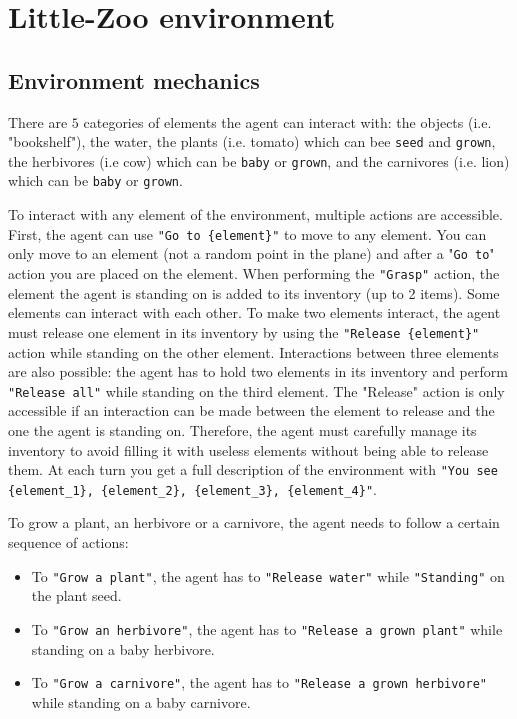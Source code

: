 \newpage
\section{Little-Zoo environment}\label{app:environment}

\subsection{Environment mechanics}
\label{app:environment_mechanics}

There are $5$ categories of elements the agent can interact with: the objects (i.e. "bookshelf"), the water, the plants (i.e. tomato) which can bee \texttt{seed} and \texttt{grown}, the herbivores (i.e cow) which can be \texttt{baby} or \texttt{grown}, and the carnivores (i.e. lion) which can be \texttt{baby} or \texttt{grown}. 

To interact with any element of the environment, multiple actions are accessible. First, the agent can use \texttt{"Go to \{element\}"} to move to any element. You can only move to an element (not a random point in the plane) and after a "\texttt{Go to}" action you are placed on the element. When performing the \texttt{"Grasp"} action, the element the agent is standing on is added to its inventory (up to 2 items). Some elements can interact with each other. To make two elements interact, the agent must release one element in its inventory by using the \texttt{"Release \{element\}"} action while standing on the other element. Interactions between three elements are also possible: the agent has to hold two elements in its inventory and perform \texttt{"Release all"} while standing on the third element. The "Release" action is only accessible if an interaction can be made between the element to release and the one the agent is standing on. Therefore, the agent must carefully manage its inventory to avoid filling it with useless elements without being able to release them. At each turn you get a full description of the environment with \texttt{"You see \{element\_1\}, \{element\_2\}, \{element\_3\}, \{element\_4\}"}.

To grow a plant, an herbivore or a carnivore, the agent needs to follow a certain sequence of actions:
\begin{itemize}
    \item To \texttt{"Grow a plant"}, the agent has to \texttt{"Release water"} while \texttt{"Standing"} on the plant seed.
    \item To \texttt{"Grow an herbivore"}, the agent has to \texttt{"Release a grown plant"} while standing on a baby herbivore.
    \item  To \texttt{"Grow a carnivore"}, the agent has to \texttt{"Release a grown herbivore"} while standing on a baby carnivore.
\end{itemize}

